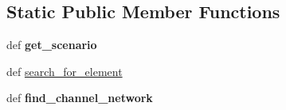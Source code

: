 \subsection*{Static Public Member Functions}
\begin{DoxyCompactItemize}
\item 
\hypertarget{classcore_1_1misc_1_1xmlparser1_1_1_core_document_parser1_a15c945eec18da03e98bf0edcd28a9d27}{def {\bfseries get\+\_\+scenario}}\label{classcore_1_1misc_1_1xmlparser1_1_1_core_document_parser1_a15c945eec18da03e98bf0edcd28a9d27}

\item 
def \hyperlink{classcore_1_1misc_1_1xmlparser1_1_1_core_document_parser1_ad8f7c9138458d36f2cbe79a6663147ea}{search\+\_\+for\+\_\+element}
\item 
\hypertarget{classcore_1_1misc_1_1xmlparser1_1_1_core_document_parser1_a188bb1b640fe68b6cad89db66804db68}{def {\bfseries find\+\_\+channel\+\_\+network}}\label{classcore_1_1misc_1_1xmlparser1_1_1_core_document_parser1_a188bb1b640fe68b6cad89db66804db68}

\end{DoxyCompactItemize}
